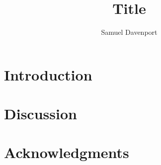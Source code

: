 \documentclass[12pt]{article}
\title{Title}
\author{Samuel Davenport}
\theoremstyle{definition}
\begin{document}
	
\maketitle

\begin{abstract}
	
\end{abstract}

\section{Introduction}




\section{Discussion}


\section*{Acknowledgments}





%
\end{document}
